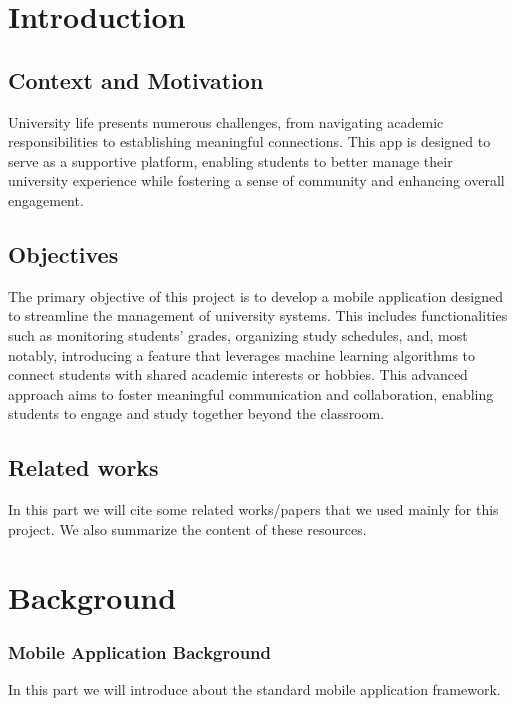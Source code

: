 \documentclass{article}
\begin{document}


\tableofcontents
\newpage



\section{Introduction}

\subsection{Context and Motivation}
\noindent University life presents numerous challenges, 
from navigating academic responsibilities to establishing meaningful connections. 
This app is designed to serve as a supportive platform, 
enabling students to better manage their university experience while 
fostering a sense of community and enhancing overall engagement.
\subsection{Objectives}

The primary objective of this project is to develop a mobile application designed to streamline the management of university systems. 
This includes functionalities such as monitoring students' grades, organizing study schedules, and, most notably, introducing 
a feature that leverages machine learning algorithms to connect students with shared academic interests or hobbies. 
This advanced approach aims to foster meaningful communication and collaboration, enabling students to engage and study together beyond the classroom.


\subsection{Related works}

In this part we will cite some related works/papers that we used mainly for this 
project. We also summarize the content of these resources.


\section{Background}
\subsubsection{Mobile Application Background}
In this part we will introduce about the standard mobile application framework.
\end{document}
